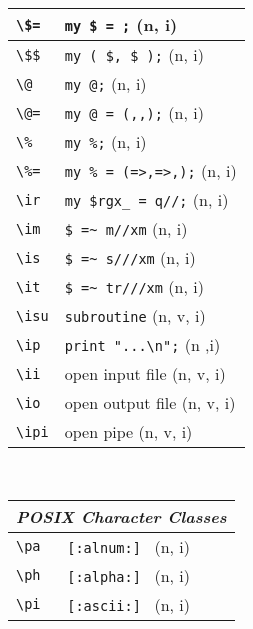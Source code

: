 \documentclass[oneside,10pt,landscape,DIV17]{scrartcl}
\begin{document}
\begin{multicols}{3}
\begin{center}
\begin{tabular}[]{|p{11mm}|p{58mm}|}
\hline \verb'\$='  & \verb'my $ = ;'           \hfill (n, i)   \\
\hline \verb'\$$'  & \verb'my ( $, $ );'       \hfill (n, i)   \\
\hline \verb'\@'   & \verb'my @;'              \hfill (n, i)   \\
\hline \verb'\@='  & \verb'my @ = (,,);'       \hfill (n, i)   \\
\hline \verb'\%'   & \verb'my %;'              \hfill (n, i)   \\
\hline \verb'\%='  & \verb'my % = (=>,=>,);'   \hfill (n, i)   \\
\hline \verb'\ir'  & \verb'my $rgx_ = q//;'    \hfill (n, i)   \\
\hline \verb'\im'  & \verb'$ =~ m//xm'         \hfill (n, i)   \\
\hline \verb'\is'  & \verb'$ =~ s///xm'        \hfill (n, i)   \\
\hline \verb'\it'  & \verb'$ =~ tr///xm'       \hfill (n, i)   \\
\hline \verb'\isu' & \verb'subroutine'         \hfill (n, v, i)\\
\hline \verb'\ip'  & \verb'print "...\n";'     \hfill (n ,i)   \\
\hline \verb'\ii'  & open input file           \hfill (n, v, i)\\
\hline \verb'\io'  & open output file          \hfill (n, v, i)\\
\hline \verb'\ipi' & open pipe                 \hfill (n, v, i)\\
\hline
\end{tabular}\\
%
%
\begin{tabular}[]{|p{11mm}|p{58mm}|}
\hline
\multicolumn{2}{|r|}{\textsl{\textbf{P}OSIX Character Classes}}\\
\hline \verb'\pa' &  \verb'[:alnum:] '         \hfill (n, i)   \\
\hline \verb'\ph' &  \verb'[:alpha:] '         \hfill (n, i)   \\
\hline \verb'\pi' &  \verb'[:ascii:] '         \hfill (n, i)   \\

\end{tabular}
\end{center}
\end{multicols}
\end{document}
